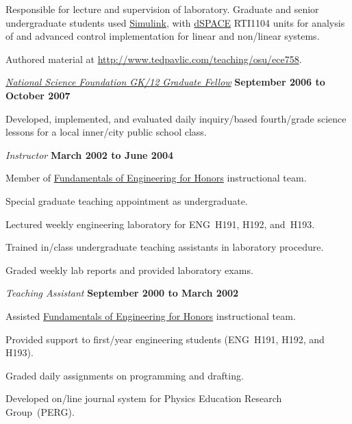 \documentclass[10pt]{article}           %
\newcommand{\entry}{\item[{}]}
\begin{document}
\begin{cvlist}[loose]
\begin{cvlist}
\begin{cvlist}

            \item Responsible for lecture and supervision of laboratory.
                Graduate and senior undergraduate students used
                \href{http://www.mathworks.com/products/simulink/}{Simulink},
                with \href{http://www.dspaceinc.com/}{dSPACE} RTI1104
                units for analysis of and advanced control implementation
                for linear and non\-/linear systems.

            \item Authored material at
                \url{http://www.tedpavlic.com/teaching/osu/ece758}.
        \end{cvlist}
    \end{cvlist}

    \entry \href{http://www.nsfgk12.org/}
            {\emph{National Science Foundation GK\-/12 Graduate Fellow}}
            \hfill \textbf{September 2006 to October 2007}
    \begin{cvlist}
        \entry Developed, implemented, and evaluated daily inquiry\-/based
            fourth\-/grade science lessons for a local inner\-/city public
            school class.
    \end{cvlist}

    \entry \textit{Instructor}%
            \hfill \textbf{March 2002 to June 2004}
    \begin{cvlist}
        \item Member of \href{http://feh.eng.ohio-state.edu/}
                             {Fundamentals of Engineering for Honors}
              instructional team.
        \item Special graduate teaching appointment as undergraduate.
        \item Lectured weekly engineering laboratory for ENG~H191,
                H192, and~H193.
        \item Trained in\-/class undergraduate teaching assistants in laboratory
                procedure.
        \item Graded weekly lab reports and provided laboratory exams.
    \end{cvlist}

    \entry \textit{Teaching Assistant}%
            \hfill \textbf{September 2000 to March 2002}
    \begin{cvlist}
        \item Assisted \href{http://feh.eng.ohio-state.edu/}
                            {Fundamentals of Engineering for Honors}
              instructional team.
        \item Provided support to first\-/year engineering students (ENG~H191,
              H192, and H193).
        \item Graded daily assignments on programming and drafting.
        \item Developed on\-/line journal system for Physics Education Research
              Group~(PERG).
    \end{cvlist}


\end{cvlist}
\end{document}
